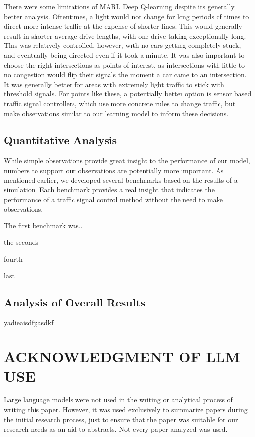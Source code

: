 \documentclass[conference]{IEEEtran}
\begin{document}
There were some limitations of MARL Deep Q-learning despite its generally better analysis. Oftentimes, a light would not change for long periods of times to direct more intense traffic at the expense of shorter lines. This would generally result in shorter average drive lengths, with one drive taking exceptionally long. This was relatively controlled, however, with no cars getting completely stuck, and eventually being directed even if it took a minute. It was also important to choose the right intersections as points of interest, as intersections with little to no congestion would flip their signals the moment a car came to an intersection. It was generally better for areas with extremely light traffic to stick with threshold signals. For points like these, a potentially better option is sensor based traffic signal controllers, which use more concrete rules to change traffic, but make observations similar to our learning model to inform these decisions. 

\subsection{Quantitative Analysis}

While simple observations provide great insight to the performance of our model, numbers to support our observations are potentially more important. As mentioned earlier, we developed several benchmarks based on the results of a simulation. Each benchmark provides a real insight that indicates the performance of a traffic signal control method without the need to make observations. 

The first benchmark was..

the seconds

fourth

last

\subsection{Analysis of Overall Results}

yadieaisdfj;asdkf

\section{ACKNOWLEDGMENT OF LLM USE}

Large language models were not used in the writing or analytical process of writing this paper. However, it was used exclusively to summarize papers during the initial research process, just to ensure that the paper was suitable for our research needs as an aid to abstracts. Not every paper analyzed was used. 
\end{document}

